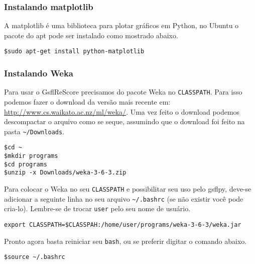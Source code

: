 \documentclass[a4paper]{article}
\begin{document}
\subsubsection{Instalando matplotlib}
A matplotlib é uma biblioteca para plotar gráficos em Python, no Ubuntu
o pacote do apt pode ser instalado como mostrado abaixo.
\begin{verbatim}
$sudo apt-get install python-matplotlib
\end{verbatim}

\subsubsection{Instalando Weka}
Para usar o GsflReScore precisamos do pacote Weka no \texttt{CLASSPATH}. Para
isso podemos fazer o download da versão mais recente em:
\url{http://www.cs.waikato.ac.nz/ml/weka/}. Uma vez feito o download
podemos descompactar o arquivo como se seque, assumindo que o download
foi feito na pasta \texttt{\~{}/Downloads}.
\begin{verbatim}
$cd ~
$mkdir programs
$cd programs
$unzip -x Downloads/weka-3-6-3.zip
\end{verbatim}
Para colocar o Weka no seu \texttt{CLASSPATH} e possibilitar seu uso pelo gsflpy,
deve-se adicionar a seguinte linha no seu arquivo \texttt{\~{}/.bashrc} (se não existir
você pode cria-lo). Lembre-se de trocar \texttt{user} pelo seu nome de usuário.
\begin{verbatim}
export CLASSPATH=$CLASSPAH:/home/user/programs/weka-3-6-3/weka.jar
\end{verbatim}
Pronto agora basta reiniciar seu \texttt{bash}, ou se preferir digitar o comando abaixo.
\begin{verbatim}
$source ~/.bashrc
\end{verbatim}



\end{document}
